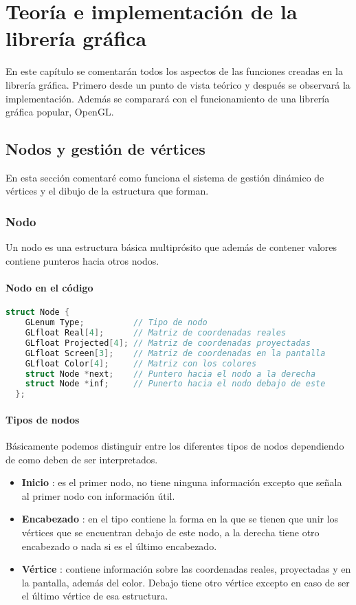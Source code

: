 \documentclass{report}
\begin{document}
\newpage

\chapter{Teoría e implementación de la librería gráfica}
En este capítulo se comentarán todos los aspectos de las funciones creadas en la librería gráfica. Primero desde un punto de vista teórico y después se observará la implementación. Además se comparará con el funcionamiento de una librería gráfica popular, OpenGL.
\section{Nodos y gestión de vértices}
En esta sección comentaré como funciona el sistema de gestión dinámico de vértices y el dibujo de la estructura que forman.
\subsection{Nodo}
Un nodo es una estructura básica multiprósito que además de contener valores contiene punteros hacia otros nodos.
\subsubsection{Nodo en el código}
\begin{lstlisting}[language=C]
  struct Node {
    GLenum Type;          // Tipo de nodo
    GLfloat Real[4];      // Matriz de coordenadas reales
    GLfloat Projected[4]; // Matriz de coordenadas proyectadas
    GLfloat Screen[3];    // Matriz de coordenadas en la pantalla
    GLfloat Color[4];     // Matriz con los colores
    struct Node *next;    // Puntero hacia el nodo a la derecha  
    struct Node *inf;     // Punerto hacia el nodo debajo de este
  };
\end{lstlisting}
\subsubsection{Tipos de nodos}
Básicamente podemos distinguir entre los diferentes tipos de nodos dependiendo de como deben de ser interpretados.
\begin{itemize}
\item{\textbf{Inicio} : es el primer nodo, no tiene ninguna información excepto que señala al primer nodo con información útil.}
\item{\textbf{Encabezado} : en el tipo contiene la forma en la que se tienen que unir los vértices que se encuentran debajo de este nodo, a la derecha tiene otro encabezado o nada si es el último encabezado.}
  \item{\textbf{Vértice} : contiene información sobre las coordenadas reales, proyectadas y en la pantalla, además del color. Debajo tiene otro vértice excepto en caso de ser el último vértice de esa estructura.}
\end{itemize}
\end{document}
